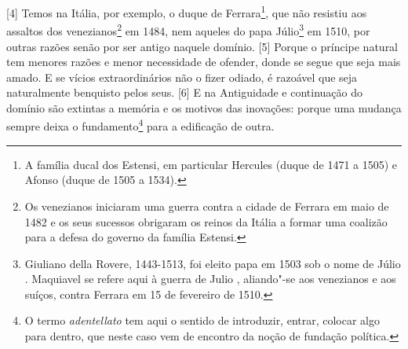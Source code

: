 {[}4{]} Temos na Itália, por exemplo, o duque de Ferrara\footnote{A
  família ducal dos Estensi, em particular Hercules  (duque de 1471 a
  1505) e Afonso  (duque de 1505 a 1534).}, que não resistiu aos
assaltos dos venezianos\footnote{Os venezianos iniciaram uma guerra
  contra a cidade de Ferrara em maio de 1482 e os seus sucessos
  obrigaram os reinos da Itália a formar uma coalizão para a defesa do
  governo da família Estensi.} em 1484, nem aqueles do papa
Júlio\footnote{Giuliano della Rovere, 1443-1513, foi eleito papa em 1503
  sob o nome de Júlio . Maquiavel se refere aqui à guerra de Julio ,
  aliando"-se aos venezianos e aos suíços, contra Ferrara em 15 de
  fevereiro de 1510.} em 1510, por outras razões senão por ser antigo
naquele domínio. {[}5{]} Porque o príncipe natural tem menores razões e
menor necessidade de ofender, donde se segue que seja mais amado. E se
vícios extraordinários não o fizer odiado, é razoável que seja
naturalmente benquisto pelos seus. {[}6{]} E na Antiguidade e
continuação do domínio são extintas a memória e os motivos das
inovações: porque uma mudança sempre deixa o fundamento\footnote{O termo
  \emph{adentellato} tem aqui o sentido de introduzir, entrar, colocar
  algo para dentro, que neste caso vem de encontro da noção de fundação
  política.} para a edificação de outra.



